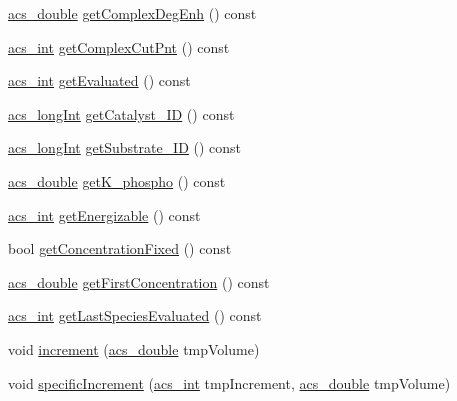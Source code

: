 \begin{DoxyCompactItemize}
\item 
\hyperlink{acs__headers_8h_ab776853a005fcbf56af0424a2a4dd607}{acs\-\_\-double} \hyperlink{classspecies_a2870bc4874efda0a1a079eb2b326ecd9}{get\-Complex\-Deg\-Enh} () const 
\item 
\hyperlink{acs__headers_8h_a8d277355641a098190360234e2ebde35}{acs\-\_\-int} \hyperlink{classspecies_a4c87285bf983ddd5635b58ce82d02a80}{get\-Complex\-Cut\-Pnt} () const 
\item 
\hyperlink{acs__headers_8h_a8d277355641a098190360234e2ebde35}{acs\-\_\-int} \hyperlink{classspecies_acb08d02f3dcadd9f422d435219d1dc57}{get\-Evaluated} () const 
\item 
\hyperlink{acs__headers_8h_a19319d75f02db4308bc5c0026d98cd85}{acs\-\_\-long\-Int} \hyperlink{classspecies_a4be19a81a4de43016316832fdf8b5f35}{get\-Catalyst\-\_\-\-I\-D} () const 
\item 
\hyperlink{acs__headers_8h_a19319d75f02db4308bc5c0026d98cd85}{acs\-\_\-long\-Int} \hyperlink{classspecies_a3bc786de75d9c6235c75eeda10b01b8d}{get\-Substrate\-\_\-\-I\-D} () const 
\item 
\hyperlink{acs__headers_8h_ab776853a005fcbf56af0424a2a4dd607}{acs\-\_\-double} \hyperlink{classspecies_a22a114de19bb6c6d550b967797529e1d}{get\-K\-\_\-phospho} () const 
\item 
\hyperlink{acs__headers_8h_a8d277355641a098190360234e2ebde35}{acs\-\_\-int} \hyperlink{classspecies_ad234e523f16507008b64f2d872d9792f}{get\-Energizable} () const 
\item 
bool \hyperlink{classspecies_aa2b24de5a97f1e06d359ab5b63817d98}{get\-Concentration\-Fixed} () const 
\item 
\hyperlink{acs__headers_8h_ab776853a005fcbf56af0424a2a4dd607}{acs\-\_\-double} \hyperlink{classspecies_a6773ef96109c27ddd4afa78b87b2fcd3}{get\-First\-Concentration} () const 
\item 
\hyperlink{acs__headers_8h_a8d277355641a098190360234e2ebde35}{acs\-\_\-int} \hyperlink{classspecies_ace7de26d4e33dddfa78f2c624cfb3666}{get\-Last\-Species\-Evaluated} () const 
\item 
void \hyperlink{classspecies_a77f68017e5c50f8943df90efd2e8a0bb}{increment} (\hyperlink{acs__headers_8h_ab776853a005fcbf56af0424a2a4dd607}{acs\-\_\-double} tmp\-Volume)
\item 
void \hyperlink{classspecies_a87e85a2397e5ec34518efa235b529d7e}{specific\-Increment} (\hyperlink{acs__headers_8h_a8d277355641a098190360234e2ebde35}{acs\-\_\-int} tmp\-Increment, \hyperlink{acs__headers_8h_ab776853a005fcbf56af0424a2a4dd607}{acs\-\_\-double} tmp\-Volume)

\end{DoxyCompactItemize}

